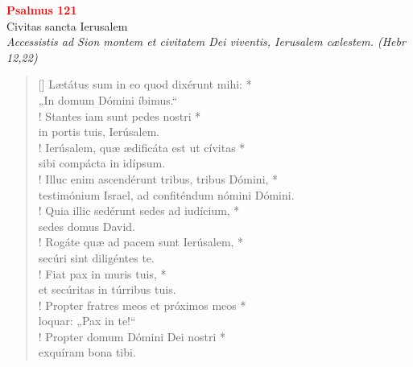 


\def\greinitialformat#1{%
{\fontsize{39}{39}\selectfont #1}%
}




\vspace{0.3cm}
\begin{center}
 \textcolor{red}{\large \bf Psalmus 121}\\
Civitas sancta Ierusalem\\
\textit{\small Accessistis ad Sion montem et civitatem Dei viventis, Ierusalem cælestem. (Hebr 12,22)}
\end{center}
\begin{verse}[\versewidth]
Lætátus sum in eo quod dixérunt mihi: *\\
„In domum Dómini íbimus.“\\!
\vin Stantes iam sunt pedes nostri *\\
\vin in portis tuis, Ierúsalem.\\!
Ierúsalem, quæ ædificáta est ut cívitas *\\
sibi compácta in idípsum.\\!
\vin Illuc enim ascendérunt tribus, tribus Dómini, *\\
\vin testimónium Israel, ad confiténdum nómini Dómini.\\!
Quia illic sedérunt sedes ad iudícium, *\\
sedes domus David.\\!
\vin Rogáte quæ ad pacem sunt Ierúsalem, *\\
\vin secúri sint diligéntes te.\\!
Fiat pax in muris tuis, *\\
et secúritas in túrribus tuis.\\!
\vin Propter fratres meos et próximos meos *\\
\vin loquar: „Pax in te!“\\!
Propter domum Dómini Dei nostri *\\
exquíram bona tibi.\\
\end{verse}
\vspace{1cm}


